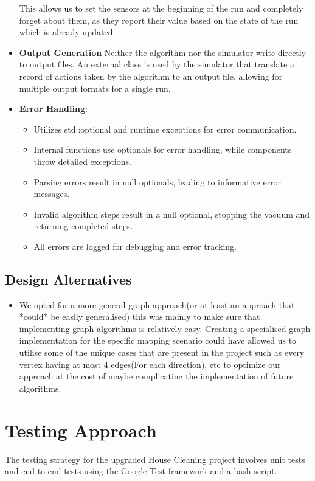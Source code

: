 \documentclass{article}
\begin{document}
\begin{itemize}
    This allows us to set the sensors at the beginning of the run and completely forget about them, as they report their value based on the state of the run which is already updated.
    \item \textbf {Output Generation} Neither the algorithm nor the simulator write directly to output files. An external class is used by the simulator that translate a record of actions taken by the algorithm to an output file, allowing for multiple output formats for a single run.
    \item \textbf{Error Handling}:
    \begin{itemize}
         \item Utilizes std::optional and runtime exceptions for error communication.
         \item Internal functions use optionals for error handling, while components throw detailed exceptions.
         \item Parsing errors result in null optionals, leading to informative error messages.
         \item Invalid algorithm steps result in a null optional, stopping the vacuum and returning completed steps.
         \item All errors are logged for debugging and error tracking.
    \end{itemize}
\end{itemize}

\subsection{Design Alternatives}
\begin{itemize}
    \item We opted for a more general graph approach(or at least an approach that *could* be easily generalised) this was mainly to make sure that implementing graph algorithms is relatively easy. Creating a specialised graph implementation for the specific mapping scenario could have allowed us to utilise some of the unique cases that are present in the project such as every vertex having at most 4 edges(For each direction), etc  to optimize our approach at the cost of maybe complicating the implementation of future algorithms.
\end{itemize}

\section{Testing Approach}
The testing strategy for the upgraded House Cleaning project involves unit tests and end-to-end tests using the Google Test framework and a bash script.
\end{document}
